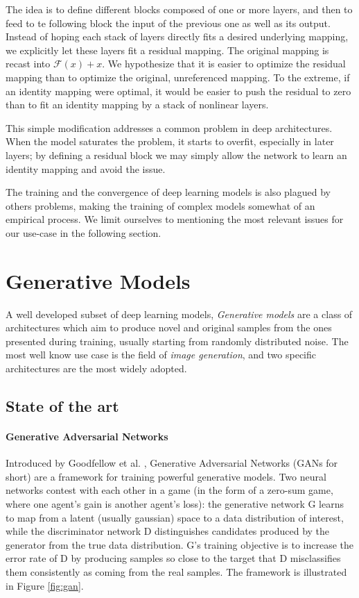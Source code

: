 The idea is to define different blocks composed of one or more layers, and then to feed to te following block the input of the previous one as well as its output. Instead of hoping each stack of layers directly fits a desired underlying mapping, we explicitly let these layers fit a residual mapping. The original mapping is recast into $\mathcal{F}(x) + x$. We hypothesize that it is easier to optimize the residual mapping than to optimize the original, unreferenced mapping. To the extreme, if an identity mapping were optimal, it would be easier to push the residual to zero than to fit an identity mapping by a stack of nonlinear layers. 

This simple modification addresses a common problem in deep architectures. When the model saturates the problem, it starts to overfit, especially in later layers; by defining a residual block we may simply allow the network to learn an identity mapping and avoid the issue.

The training and the convergence of deep learning models is also plagued by others problems, making the training of complex models somewhat of an empirical process. We limit ourselves to mentioning the most relevant issues for our use-case in the following section.

\section{Generative Models} 

A well developed subset of deep learning models, \emph{Generative models} are a class of architectures which aim to produce novel and original samples from the ones presented during training, usually starting from randomly distributed noise. The most well know use case is the field of \emph{image generation}, and two specific architectures are the most widely adopted.

\subsection{State of the art}

\paragraph{Generative Adversarial Networks}

Introduced by Goodfellow et al. \cite{gan}, Generative Adversarial Networks (GANs for short) are a framework for training powerful generative models. Two neural networks contest with each other in a game (in the form of a zero-sum game, where one agent's gain is another agent's loss): the generative network G learns to map from a latent (usually gaussian) space to a data distribution of interest, while the discriminator network D distinguishes candidates produced by the generator from the true data distribution. G's training objective is to increase the error rate of D by producing samples so close to the target that D misclassifies them consistently as coming from the real samples. The framework is illustrated in Figure \ref{fig:gan}.


